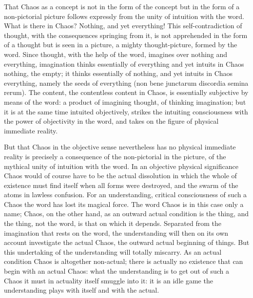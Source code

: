 \documentclass[12pt,a4paper,openany]{book}
\newcommand{\opage}[1]{\marginnote{\footnotesize\textit{[#1]}}}
\begin{document}
That Chaos as a concept is not in the form of the concept but in the form of a non-pictorial picture follows
expressly from the unity of intuition with the word. What is there in Chaos? Nothing, and yet everything! This
self-contradiction of thought, with the consequences springing from it, is not apprehended in the form of a thought
but is seen in a picture, a mighty thought-picture, formed by the word. Since thought, with the help of the word,
imagines over nothing and everything, imagination thinks essentially of everything and yet intuits in Chaos nothing,
the empty; it thinks essentially of nothing, and yet intuits in Chaos everything, namely the seeds of everything
(non bene junctarum discordia semina rerum). The content,
\opage{84}the contentless content in Chaos, is essentially subjective by means of the word: a product of imagining
thought, of thinking imagination; but it is at the same time intuited objectively, strikes the intuiting
consciousness with the power of objectivity in the word, and takes on the figure of physical immediate reality.

But that Chaos in the objective sense nevertheless has no physical immediate reality is precisely a consequence of
the non-pictorial in the picture, of the mythical unity of intuition with the word. In an objective physical
significance Chaos would of course have to be the actual dissolution in which the whole of existence must find itself
when all forms were destroyed, and the swarm of the atoms in lawless confusion. For an understanding, critical
consciousness of such a Chaos the word has lost its magical force. The word Chaos is in this case only a name; Chaos,
on the other hand, as an outward actual condition is the thing, and the thing, not the word, is that on which it
depends. Separated from the imagination that rests on the word, the understanding will then on its own account
investigate the actual Chaos, the outward actual beginning of things. But this undertaking of the understanding will
totally miscarry. As an actual condition Chaos is altogether non-actual; there is actually no existence that can
begin with an actual Chaos: what the understanding is to get out of such a Chaos it must in actuality itself smuggle
into it: it is an idle game the understanding plays with itself and with the actual.
\end{document}
